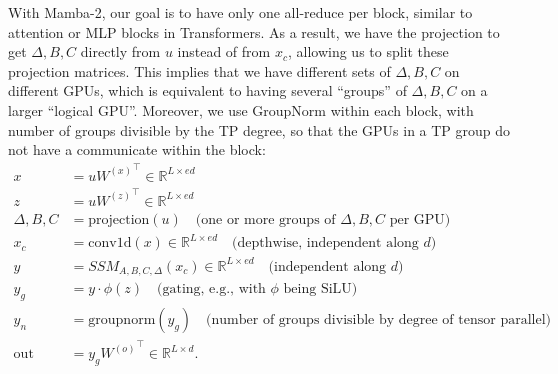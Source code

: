 \documentclass{article}
\begin{document}
With Mamba-2, our goal is to have only one all-reduce per block, similar to attention or MLP blocks in Transformers.
As a result, we have the projection to get $\Delta, B, C$ directly from $u$ instead of from $x_c$, allowing us to split these projection matrices.
This implies that we have different sets of $\Delta, B, C$ on different GPUs, which is equivalent to having several ``groups'' of $\Delta, B, C$ on a larger ``logical GPU''.
Moreover, we use GroupNorm within each block, with number of groups divisible by the TP degree, so that the GPUs in a TP group do not have a communicate within the block:
\begin{align*}
   x &= u {W^{(x)}}^\top \in \mathbb{R}^{L \times ed} \\
   z &= u {W^{(z)}}^\top \in \mathbb{R}^{L \times ed} \\
   \Delta, B, C &= \text{projection}(u) \quad \text{(one or more groups of $\Delta, B, C$ per GPU)} \\
   x_c &= \mathrm{conv1d}(x) \in \mathbb{R}^{L \times ed} \quad \text{(depthwise, independent along $d$)} \\
   y &= SSM_{A, B, C, \Delta}(x_c) \in \mathbb{R}^{L \times ed} \quad \text{(independent along $d$)} \\
   y_g &= y \cdot \phi(z)  \quad \text{(gating, e.g., with $\phi$ being SiLU)} \\
   y_n &= \mathrm{groupnorm}(y_g) \quad \text{(number of groups divisible by degree of tensor parallel)} \\
   \mathrm{out} &= y_g {W^{(o)}}^\top \in \mathbb{R}^{L \times d}.
\end{align*}
\end{document}
